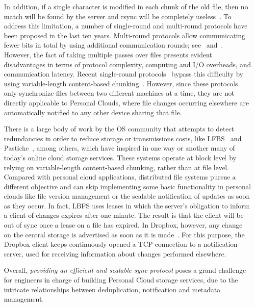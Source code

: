 In addition, if a single character is modified in each chunk of the old file, then no match
will be found by the server and rsync will be completely useless~\cite{langford01}. To address this limitation,
a number of single-round and multi-round protocols have been proposed in the last ten years. 
Multi-round protocols allow communicating fewer bits in total by using additional communication
rounds; see~\cite{langford01} and~\cite{suel04}. However, the fact of taking multiple passes over files presents evident
disadvantages in terms of protocol complexity, computing and I/O overheads, and communication
latency. Recent single-round protocols~\cite{irmak05}\cite{hao08} bypass this difficulty by using variable-length
content-based chunking~\cite{Muthitacharoen01}. However, since these protocols only synchronize files between two
different machines at a time, they are not directly applicable to Personal Clouds, where file
changes occurring elsewhere are automatically notified to any other device sharing that file. 

There is a large body of work by the OS community that attempts to detect redundancies in order
to reduce storage or transmissions costs, like LFBS~\cite{Muthitacharoen01} and Pastiche~\cite{Cox02}, among others, which
have inspired in one way or another many of today's online cloud storage services. These systems
operate at block level by relying on variable-length content-based chunking, rather than at
file level. Compared with personal cloud applications, distributed file systems pursue a
different objective and can skip implementing some basic functionality in personal clouds like
file version management or the scalable notification of updates as soon as they occur. In fact,
LBFS uses leases in which the server's obligation to inform a client of changes expires after one
minute. The result is that the client will be out of sync once a lease on a file has expired. 
In Dropbox, however, any change on the central storage is advertised as soon as it is made~\cite{drago2012inside}.
For this purpose, the Dropbox client keeps continuously opened a TCP connection to a notification
server, used for receiving information about changes performed elsewhere.

Overall, \textit{providing an efficient and scalable sync protocol} poses a grand challenge for
engineers in charge of building Personal Cloud storage services, due to the intricate
relationships between deduplication, notification and metadata management.